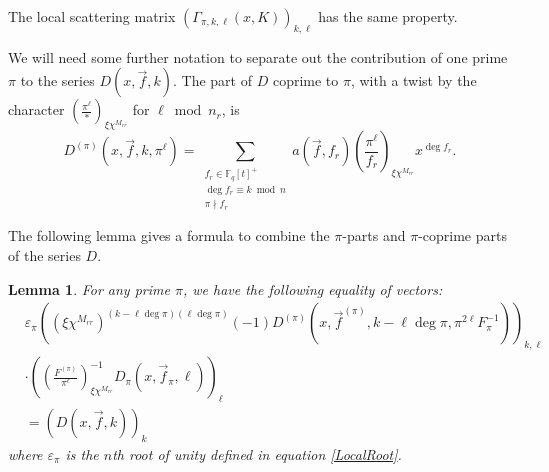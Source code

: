 \documentclass[11pt,letterpaper]{article}
\newtheorem{lemma}[theorem]{Lemma}
\theoremstyle{definition}
\theoremstyle{remark}
\numberwithin{equation}{section}
\theoremstyle{dotless}
\newcommand{\F}{\mathbb{F}}
\newcommand{\res}[2]{\left(\frac{#1}{#2}\right)}
\begin{document}
The local scattering matrix $(\Gamma_{\pi, k, \ell}(x, K))_{k, \ell}$ has the same property. 

We will need some further notation to separate out the contribution of one prime $\pi$ to the series $D(x, \vec{f}, k)$. The part of $D$ coprime to $\pi$, with a twist by the character $\res{\pi^\ell}{*}_{\xi \chi^{M_{rr}}}$ for $\ell \bmod n_r$, is 
\begin{equation}
D^{(\pi)}(x, \vec{f}, k, \pi^\ell) = \sum_{\substack{ f_r \in \F_q[t]^+ \\ \deg f_r \equiv k \bmod n \\ \pi \nmid f_r}} a(\vec{f},f_r) \res{\pi^\ell}{f_r}_{\xi \chi^{M_{rr}}} x^{\deg f_r}.
\end{equation}

The following lemma gives a formula to combine the $\pi$-parts and $\pi$-coprime parts of the series $D$.

\begin{lemma}\label{LemmaFactorization}
For any prime $\pi$, we have the following equality of vectors:
\begin{equation} \label{Factorization}
\begin{split}
&\varepsilon_\pi \left( (\xi \chi^{M_{rr}})^{(k-\ell\deg \pi)(\ell \deg \pi)} (-1)  D^{(\pi)}(x, \vec{f}^{(\pi)}, k-\ell \deg \pi, \pi^{2\ell}F_\pi^{-1}) \right)_{k, \ell} \\
&\cdot \left( \res{F^{(\pi)}}{\pi^\ell}_{\xi \chi^{M_{rr}}}^{-1} D_\pi(x, \vec{f}_\pi, \ell) \right)_\ell \\
&= \left( D(x, \vec{f}, k) \right)_k
\end{split}
\end{equation}
where $\varepsilon_\pi$ is the $n$th root of unity defined in equation \eqref{LocalRoot}.
\end{lemma}
\end{document}
